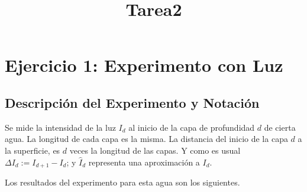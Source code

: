 \documentclass[11pt]{article}
\title{Tarea2}
\begin{document}
    
    
    

    
    \hypertarget{ejercicio-1-experimento-con-luz}{%
\section*{Ejercicio 1: Experimento con
Luz}\label{ejercicio-1-experimento-con-luz}}

\hypertarget{descripciuxf3n-del-experimento-y-notaciuxf3n}{%
\subsection*{Descripción del Experimento y
Notación}\label{descripciuxf3n-del-experimento-y-notaciuxf3n}}

Se mide la intensidad de la luz \(I_d\) al inicio de la capa de
profundidad \(d\) de cierta agua. La longitud de cada capa es la misma.
La distancia del inicio de la capa \(d\) a la superficie, es \(d\) veces
la longitud de las capas. Y como es usual \(\Delta I_d := I_{d+1}-I_d\);
y \(\hat I_d\) representa una aproximación a \(I_d\).

Los resultados del experimento para esta agua son los siguientes.
\end{document}
